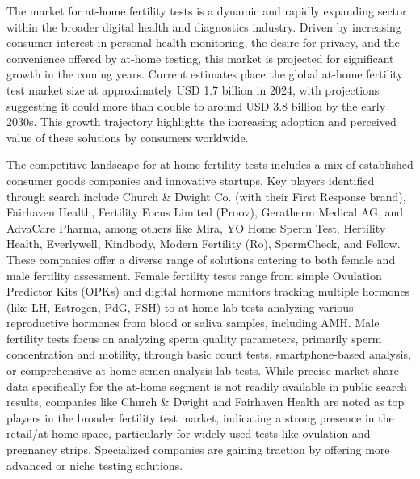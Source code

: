 \documentclass{article}
\begin{document}
The market for at-home fertility tests is a dynamic and rapidly expanding sector within the broader digital health and diagnostics industry. Driven by increasing consumer interest in personal health monitoring, the desire for privacy, and the convenience offered by at-home testing, this market is projected for significant growth in the coming years. Current estimates place the global at-home fertility test market size at approximately USD 1.7 billion in 2024, with projections suggesting it could more than double to around USD 3.8 billion by the early 2030s. This growth trajectory highlights the increasing adoption and perceived value of these solutions by consumers worldwide.

The competitive landscape for at-home fertility tests includes a mix of established consumer goods companies and innovative startups. Key players identified through search include Church \& Dwight Co. (with their First Response brand), Fairhaven Health, Fertility Focus Limited (Proov), Geratherm Medical AG, and AdvaCare Pharma, among others like Mira, YO Home Sperm Test, Hertility Health, Everlywell, Kindbody, Modern Fertility (Ro), SpermCheck, and Fellow. These companies offer a diverse range of solutions catering to both female and male fertility assessment. Female fertility tests range from simple Ovulation Predictor Kits (OPKs) and digital hormone monitors tracking multiple hormones (like LH, Estrogen, PdG, FSH) to at-home lab tests analyzing various reproductive hormones from blood or saliva samples, including AMH. Male fertility tests focus on analyzing sperm quality parameters, primarily sperm concentration and motility, through basic count tests, smartphone-based analysis, or comprehensive at-home semen analysis lab tests. While precise market share data specifically for the at-home segment is not readily available in public search results, companies like Church \& Dwight and Fairhaven Health are noted as top players in the broader fertility test market, indicating a strong presence in the retail/at-home space, particularly for widely used tests like ovulation and pregnancy strips. Specialized companies are gaining traction by offering more advanced or niche testing solutions.
\end{document}
